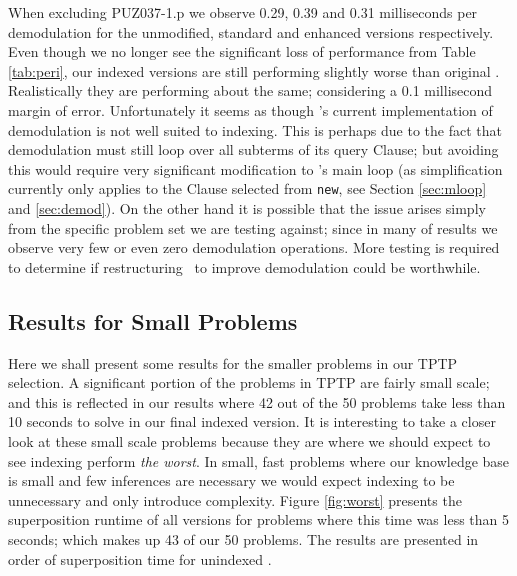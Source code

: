 When excluding PUZ037-1.p we observe 0.29, 0.39 and 0.31 milliseconds per demodulation
for the unmodified, standard and enhanced versions respectively. Even though we no
longer see the significant loss of performance from Table \ref{tab:peri}, our
indexed versions are still performing slightly worse than original \beagle. Realistically
they are performing about the same; considering a 0.1 millisecond margin of error. Unfortunately
it seems as though \beagle's current implementation of demodulation is not well suited
to indexing. This is perhaps due to the fact that demodulation must still loop
over all subterms of its query Clause; but avoiding this would require very significant
modification to \beagle's main loop (as simplification currently only applies to
the Clause selected from \verb!new!, see Section \ref{sec:mloop} and \ref{sec:demod}).
On the other hand it is possible that the issue arises simply from
the specific problem set we are testing against; since in many of results we observe
very few or even zero demodulation operations. More testing is required to determine
if restructuring \beagle\ to improve demodulation could be worthwhile.


\subsection{Results for Small Problems}
\label{sec:small}

Here we shall present some results for the smaller problems in our TPTP selection.
A significant portion of the problems in TPTP are fairly small scale; and this
is reflected in our results where 42 out of the 50 problems take less than
10 seconds to solve in our final indexed version. It is interesting to take a
closer look at these small scale problems because they are where we should expect to see
indexing perform \emph{the worst}. In small, fast problems where our knowledge base is small
and few inferences are necessary we would expect indexing to be unnecessary and
only introduce complexity. Figure \ref{fig:worst} presents the superposition runtime
of all versions for problems where this time was less than 5 seconds; which makes up 43
of our 50 problems. The results
are presented in order of superposition time for unindexed \beagle.

